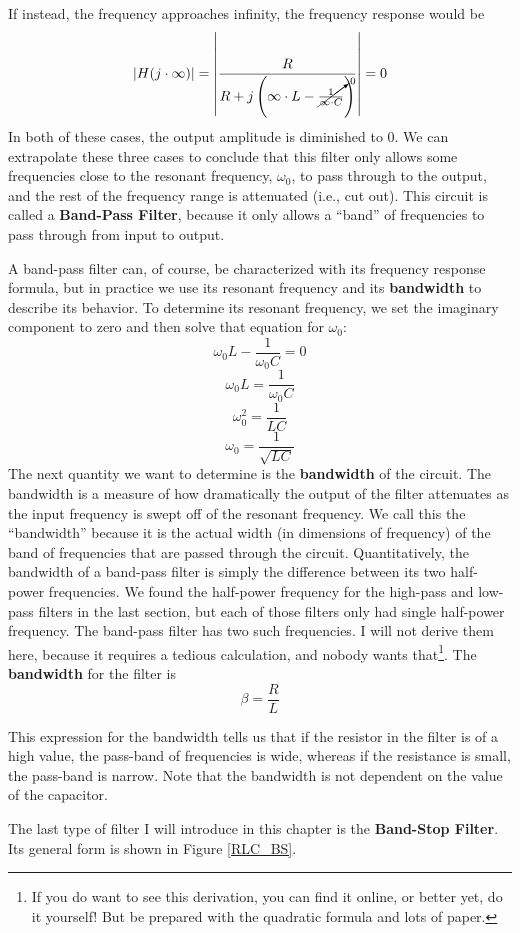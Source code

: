 If instead, the frequency approaches infinity, the frequency response would be
$$
\left|H(j\cdot\infty)\right|=\left|\frac{R}{R + j\left(\infty\cdot L-\cancelto{0}{\frac{1}{\infty\cdot C}}\right)}\right| = 0 
$$
In both of these cases, the output amplitude is diminished to 0. We can extrapolate these three cases to conclude that this filter only allows some frequencies close to the resonant frequency, $\omega_0$, to pass through to the output, and the rest of the frequency range is attenuated (i.e., cut out). This circuit is called a \textbf{Band-Pass Filter}, because it only allows a ``band'' of frequencies to pass through from input to output. 
\par
A band-pass filter can, of course, be characterized with its frequency response formula, but in practice we use its resonant frequency and its \textbf{bandwidth} to describe its behavior. To determine its resonant frequency, we set the imaginary component to zero and then solve that equation for $\omega_0$:
$$
\omega_0 L-\frac{1}{\omega_0 C} = 0
$$
$$
\omega_0 L = \frac{1}{\omega_0 C}
$$
$$
\omega_0^2 = \frac{1}{LC}
$$
$$
\omega_0 = \frac{1}{\sqrt{LC}}
$$
The next quantity we want to determine is the \textbf{bandwidth} of the circuit. The bandwidth is a measure of how dramatically the output of the filter attenuates as the input frequency is swept off of the resonant frequency. We call this the ``bandwidth'' because it is the actual width (in dimensions of frequency) of the band of frequencies that are passed through the circuit. Quantitatively, the bandwidth of a band-pass filter is simply the difference between its two half-power frequencies. We found the half-power frequency for the high-pass and low-pass filters in the last section, but each of those filters only had single half-power frequency. The band-pass filter has two such frequencies. I will not derive them here, because it requires a tedious calculation, and nobody wants that\footnote{If you do want to see this derivation, you can find it online, or better yet, do it yourself! But be prepared with the quadratic formula and lots of paper.}. The \textbf{bandwidth} for the filter is
$$
\beta = \frac{R}{L}
$$
\par
This expression for the bandwidth tells us that if the resistor in the filter is of a high value, the pass-band of frequencies is wide, whereas if the resistance is small, the pass-band is narrow. Note that the bandwidth is not dependent on the value of the capacitor.
\par
The last type of filter I will introduce in this chapter is the \textbf{Band-Stop Filter}. Its general form is shown in Figure \ref{RLC_BS}. 
